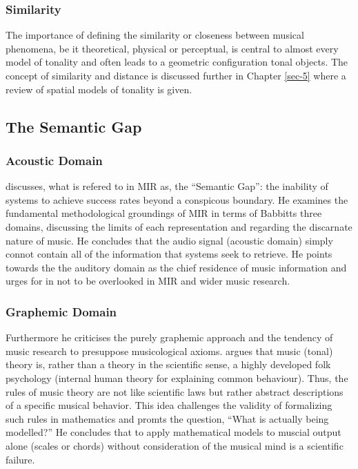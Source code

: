 \documentclass{article}
\begin{document}
\subsubsection{Similarity}
\label{sec-2-2-3}

The importance of defining the similarity or closeness between musical
phenomena, be it theoretical, physical or perceptual, is central to
almost every model of tonality and often leads to a geometric
configuration tonal objects. The concept of similarity and distance is
discussed further in Chapter \ref{sec-5} where a review
of spatial models of tonality is given.
\subsection{The Semantic Gap}
\label{sec-2-3}
\subsubsection{Acoustic Domain}
\label{sec-2-3-1}

\citep{Wiggins2009} discusses, what is refered to in MIR as, the
``Semantic Gap'': the inability of systems to achieve success rates
beyond a conspicous boundary. He examines the fundamental
methodological groundings of MIR in terms of Babbitts three domains,
discussing the limits of each representation and regarding the
discarnate nature of music. He concludes that the audio signal
(acoustic domain) simply connot contain all of the information that
systems seek to retrieve. He points towards the the auditory domain as
the chief residence of music information and urges for in not to be
overlooked in MIR and wider music research.
\subsubsection{Graphemic Domain}
\label{sec-2-3-2}

Furthermore he criticises the purely graphemic approach and the
tendency of music research to presuppose musicological
axioms. \citep{Wiggins2012} argues that music (tonal) theory is,
rather than a theory in the scientific sense, a highly developed folk
psychology (internal human theory for explaining common
behaviour). Thus, the rules of music theory are not like scientific
laws but rather abstract descriptions of a specific musical
behavior. This idea challenges the validity of formalizing such rules
in mathematics and promts the question, ``What is actually being
modelled?'' He concludes that to apply mathematical models to muscial
output alone (scales or chords) without consideration of the musical
mind is a scientific failure.
\end{document}
